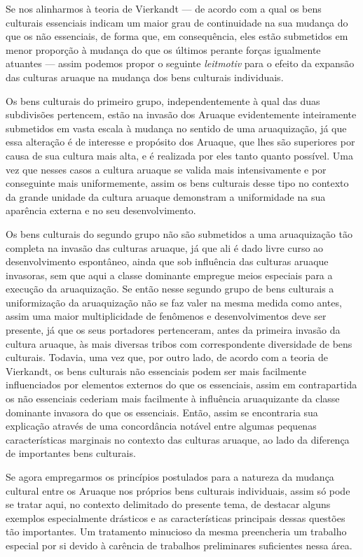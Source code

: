 Se nos alinharmos à teoria de Vierkandt --- de acordo com a qual os bens
culturais essenciais indicam um maior grau de continuidade na sua
mudança do que os não essenciais, de forma que, em consequência, eles
estão submetidos em menor proporção à mudança do que os últimos perante
forças igualmente atuantes --- assim podemos propor o seguinte
\textit{leitmotiv} para o efeito da expansão das culturas aruaque na
mudança dos bens culturais individuais.

Os bens culturais do primeiro grupo, independentemente à qual das duas
subdivisões pertencem, estão na invasão dos Aruaque evidentemente
inteiramente submetidos em vasta escala à mudança no sentido de uma
aruaquização, já que essa alteração é de interesse e propósito dos
Aruaque, que lhes são superiores por causa de sua cultura mais alta, e
é realizada por eles tanto quanto possível. Uma vez que nesses casos a
cultura aruaque se valida mais intensivamente e por conseguinte mais
uniformemente, assim os bens culturais desse tipo no contexto da grande
unidade da cultura aruaque demonstram a uniformidade na sua aparência
externa e no seu desenvolvimento.

Os bens culturais do segundo grupo não são submetidos a uma aruaquização
tão completa na invasão das culturas aruaque, já que ali é dado livre
curso ao desenvolvimento espontâneo, ainda que sob influência das
culturas aruaque invasoras, sem que aqui a classe dominante empregue
meios especiais para a execução da aruaquização. Se então nesse segundo
grupo de bens culturais a uniformização da aruaquização não se faz
valer na mesma medida como antes, assim uma maior multiplicidade de
fenômenos e desenvolvimentos deve ser presente, já que os seus
portadores pertenceram, antes da primeira invasão da cultura aruaque, às
mais diversas tribos com correspondente diversidade de bens culturais.
Todavia, uma vez que, por outro lado, de acordo com a teoria de
Vierkandt, os bens culturais não essenciais podem ser mais facilmente
influenciados por elementos externos do que os essenciais, assim em
contrapartida os não essenciais cederiam mais facilmente à influência
aruaquizante da classe dominante invasora do que os essenciais. Então,
assim se encontraria sua explicação através de uma concordância notável
entre algumas pequenas características marginais no contexto das
culturas aruaque, ao lado da diferença de importantes bens culturais.

Se agora empregarmos os princípios postulados para a natureza da
mudança cultural entre os Aruaque nos próprios bens culturais
individuais, assim só pode se tratar aqui, no contexto delimitado do
presente tema, de destacar alguns exemplos especialmente drásticos e as
características principais dessas questões tão importantes. Um
tratamento minucioso da mesma preencheria um trabalho especial por si
devido à carência de trabalhos preliminares suficientes nessa área.

